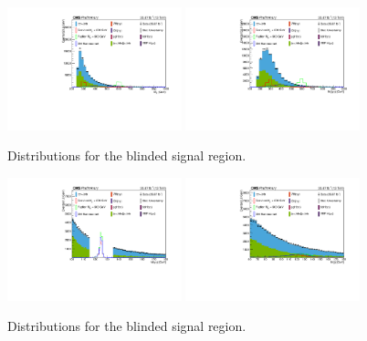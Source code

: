 \begin{figure}[thb]
  \centering
\includegraphics[width=0.45\textwidth]{figures/sec-control/NP_MXprime.pdf}\hfil
\includegraphics[width=0.45\textwidth]{figures/sec-control/NP_dicandidate_Mass.pdf}\hfil
  \caption{Distributions for the blinded signal region.}
\label{fig:cp_mgg1}
\end{figure}
\begin{figure}[thb]
  \centering
\includegraphics[width=0.45\textwidth]{figures/sec-control/NP_diPho_Mass.pdf}\hfil
\includegraphics[width=0.45\textwidth]{figures/sec-control/NP_diJet_Mass.pdf}\hfil
  \caption{Distributions for the blinded signal region.}
\label{fig:cp_mgg2}
\end{figure}
